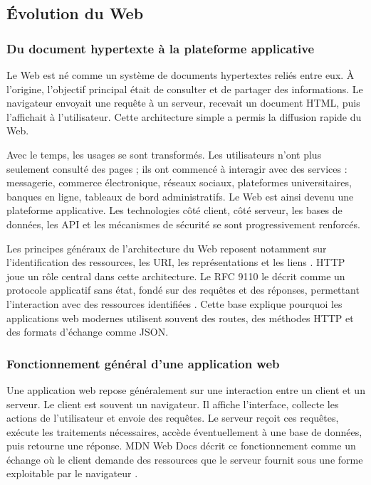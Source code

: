 \label{sec:service_composition}

\subsection{Évolution du Web}

\subsubsection{Du document hypertexte à la plateforme applicative}

Le Web est né comme un système de documents hypertextes reliés entre eux. À l'origine, l'objectif principal était de consulter et de partager des informations. Le navigateur envoyait une requête à un serveur, recevait un document HTML, puis l'affichait à l'utilisateur. Cette architecture simple a permis la diffusion rapide du Web.

Avec le temps, les usages se sont transformés. Les utilisateurs n'ont plus seulement consulté des pages ; ils ont commencé à interagir avec des services : messagerie, commerce électronique, réseaux sociaux, plateformes universitaires, banques en ligne, tableaux de bord administratifs. Le Web est ainsi devenu une plateforme applicative. Les technologies côté client, côté serveur, les bases de données, les API et les mécanismes de sécurité se sont progressivement renforcés.

Les principes généraux de l'architecture du Web reposent notamment sur l'identification des ressources, les URI, les représentations et les liens \cite{w3c2004webarch}. HTTP joue un rôle central dans cette architecture. Le RFC 9110 le décrit comme un protocole applicatif sans état, fondé sur des requêtes et des réponses, permettant l'interaction avec des ressources identifiées \cite{rfc9110}. Cette base explique pourquoi les applications web modernes utilisent souvent des routes, des méthodes HTTP et des formats d'échange comme JSON.

\subsubsection{Fonctionnement général d'une application web}

Une application web repose généralement sur une interaction entre un client et un serveur. Le client est souvent un navigateur. Il affiche l'interface, collecte les actions de l'utilisateur et envoie des requêtes. Le serveur reçoit ces requêtes, exécute les traitements nécessaires, accède éventuellement à une base de données, puis retourne une réponse. MDN Web Docs décrit ce fonctionnement comme un échange où le client demande des ressources que le serveur fournit sous une forme exploitable par le navigateur \cite{mdn2026webworks}.

